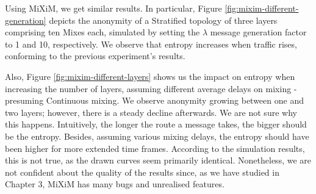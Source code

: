 \documentclass[logo,msc,cyber]{infthesis}   %
\begin{document}
 Using MiXiM, we get similar results. In particular, Figure
 \ref{fig:mixim-different-generation} depicts the anonymity of a Stratified
 topology of three layers comprising ten Mixes each, simulated by setting the
 $\lambda$ message generation factor to 1 and 10, respectively. We observe that
 entropy increases when traffic rises, conforming to the previous experiment's
 results.

 Also, Figure \ref{fig:mixim-different-layers} shows us the impact on entropy
 when increasing the number of layers, assuming different average delays on
 mixing - presuming Continuous mixing. We observe anonymity growing between one
 and two layers; however, there is a steady decline afterwards. We are not sure
 why this happens. Intuitively, the longer the route a message takes, the bigger
 should be the entropy. Besides, assuming various mixing delays, the entropy
 should have been higher for more extended time frames. According to the
 simulation results, this is not true, as the drawn curves seem primarily
 identical. Nonetheless, we are not confident about the quality of the results
 since, as we have studied in Chapter 3, MiXiM has many bugs and unrealised
 features.
\end{document}
